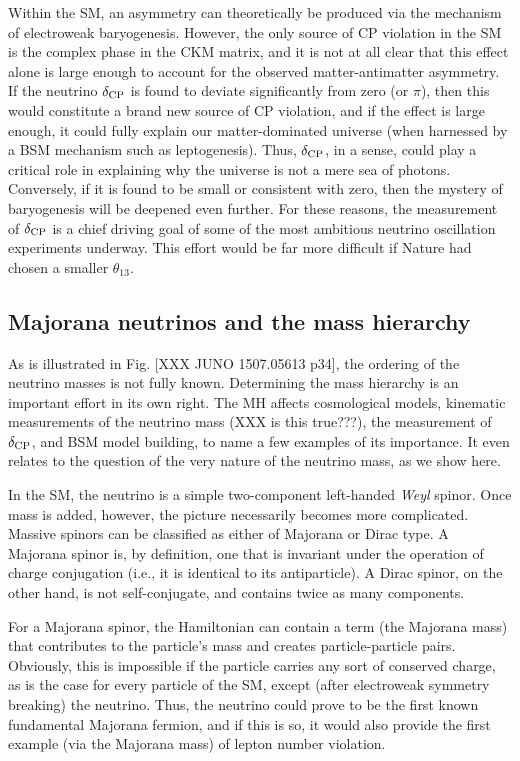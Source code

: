 \documentclass[../thesis.tex]{subfiles}
\begin{document}
Within the SM, an asymmetry can theoretically be produced via the mechanism of electroweak baryogenesis. However, the only source of CP violation in the SM is the complex phase in the CKM matrix, and it is not at all clear that this effect alone is large enough to account for the observed matter-antimatter asymmetry. If the neutrino $\delta_\text{CP}$ is found to deviate significantly from zero (or $\pi$), then this would constitute a brand new source of CP violation, and if the effect is large enough, it could fully explain our matter-dominated universe (when harnessed by a BSM mechanism such as leptogenesis). Thus, $\delta_\text{CP}$, in a sense, could play a critical role in explaining why the universe is not a mere sea of photons. Conversely, if it is found to be small or consistent with zero, then the mystery of baryogenesis will be deepened even further. For these reasons, the measurement of $\delta_\text{CP}$ is a chief driving goal of some of the most ambitious neutrino oscillation experiments underway. This effort would be far more difficult if Nature had chosen a smaller $\theta_{13}$.

\subsection{Majorana neutrinos and the mass hierarchy}
\label{sec:majorana}

As is illustrated in Fig. [XXX JUNO 1507.05613 p34], the ordering of the neutrino masses is not fully known. Determining the mass hierarchy is an important effort in its own right. The MH affects cosmological models, kinematic measurements of the neutrino mass (XXX is this true???), the measurement of $\delta_\text{CP}$, and BSM model building, to name a few examples of its importance. It even relates to the question of the very nature of the neutrino mass, as we show here.

In the SM, the neutrino is a simple two-component left-handed \emph{Weyl} spinor. Once mass is added, however, the picture necessarily becomes more complicated. Massive spinors can be classified as either of Majorana or Dirac type. A Majorana spinor is, by definition, one that is invariant under the operation of charge conjugation (i.e., it is identical to its antiparticle). A Dirac spinor, on the other hand, is not self-conjugate, and contains twice as many components.

For a Majorana spinor, the Hamiltonian can contain a term (the Majorana mass) that contributes to the particle's mass and creates particle-particle pairs. Obviously, this is impossible if the particle carries any sort of conserved charge, as is the case for every particle of the SM, except (after electroweak symmetry breaking) the neutrino. Thus, the neutrino could prove to be the first known fundamental Majorana fermion, and if this is so, it would also provide the first example (via the Majorana mass) of lepton number violation.
\end{document}
